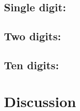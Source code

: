 \subsection{Single digit:}

\subsection{Two digits:}

\subsection{Ten digits:}

\section{Discussion}

